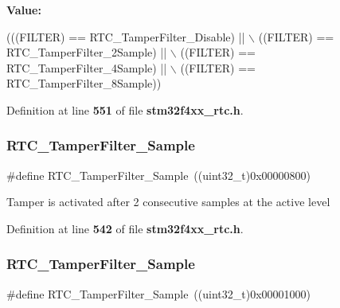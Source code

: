 {\bfseries Value\+:}
\begin{DoxyCode}
(((FILTER) == RTC_TamperFilter_Disable) || \(\backslash\)
                                      ((FILTER) == RTC_TamperFilter_2Sample) || \(\backslash\)
                                      ((FILTER) == RTC_TamperFilter_4Sample) || \(\backslash\)
                                      ((FILTER) == RTC_TamperFilter_8Sample))
\end{DoxyCode}


Definition at line \textbf{ 551} of file \textbf{ stm32f4xx\+\_\+rtc.\+h}.

\mbox{\label{group__RTC__Tamper__Filter__Definitions_gae036968e2f4d9ed7d71587df94bd2f41}} 
\subsubsection{R\+T\+C\+\_\+\+Tamper\+Filter\+\_\+Sample}
{\footnotesize\ttfamily \#define R\+T\+C\+\_\+\+Tamper\+Filter\+\_\+Sample~((uint32\+\_\+t)0x00000800)}

Tamper is activated after 2 consecutive samples at the active level 

Definition at line \textbf{ 542} of file \textbf{ stm32f4xx\+\_\+rtc.\+h}.

\mbox{\label{group__RTC__Tamper__Filter__Definitions_ga1d36f9a5326a4ed71de0f28365ee65e6}} 
\subsubsection{R\+T\+C\+\_\+\+Tamper\+Filter\+\_\+Sample}
{\footnotesize\ttfamily \#define R\+T\+C\+\_\+\+Tamper\+Filter\+\_\+Sample~((uint32\+\_\+t)0x00001000)}

